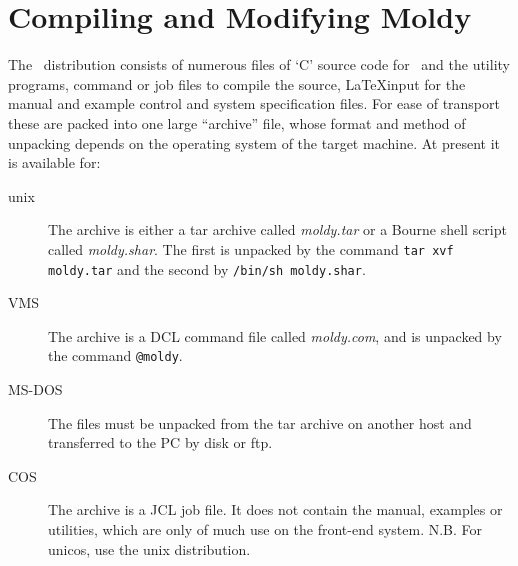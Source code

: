 \chapter{Compiling and Modifying Moldy} %

The \moldy\  distribution consists of numerous files of `C' source code
for \moldy\  and the utility programs, command or job files to compile
the source, \LaTeX input for the manual and example control and system
specification files.  For ease of transport these are packed into one
large ``archive'' file, whose format and method of unpacking depends
on the operating system of the target machine.  At present it is
available for:

\begin{description}
\item[unix]  The archive is either a tar archive called {\em
moldy.tar\/} or a Bourne shell script called {\em moldy.shar}. The first
is unpacked by the command \verb+tar xvf moldy.tar+ and the second by
\verb+/bin/sh moldy.shar+.

\item[VMS]  The archive is a DCL command file called {\em moldy.com},
and is unpacked by the command \verb'@moldy'.

\item[MS-DOS] The files must be unpacked from the tar archive on
another host and transferred to the PC by disk or ftp.

\item[COS]  The archive is a JCL job file. It does not contain the
manual, examples or utilities, which are only of much use on the
front-end system.  N.B.  For unicos, use the unix distribution.
\end{description}


